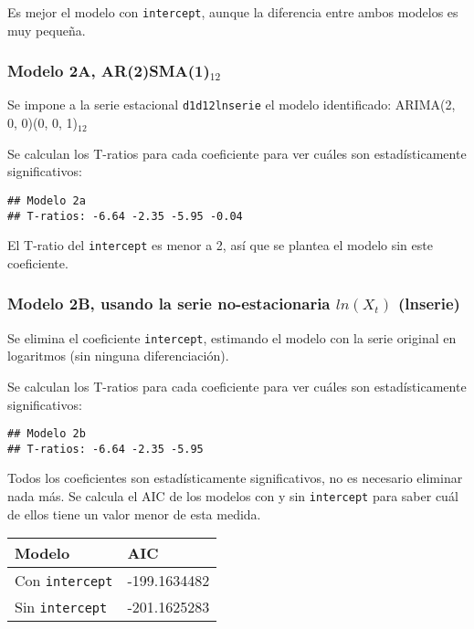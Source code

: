 \documentclass[
]{article}
\begin{document}
Es mejor el modelo con \texttt{intercept}, aunque la diferencia entre
ambos modelos es muy pequeña.

\medskip

\hypertarget{modelo-2a-ar2sma1_12}{%
\subsubsection{\texorpdfstring{Modelo 2A,
AR(2)SMA(1)\(_{12}\)}{Modelo 2A, AR(2)SMA(1)\_\{12\}}}\label{modelo-2a-ar2sma1_12}}

Se impone a la serie estacional \texttt{d1d12lnserie} el modelo
identificado: ARIMA(2, 0, 0)(0, 0, 1)\(_{12}\)

Se calculan los T-ratios para cada coeficiente para ver cuáles son
estadísticamente significativos:

\begin{verbatim}
## Modelo 2a 
## T-ratios: -6.64 -2.35 -5.95 -0.04
\end{verbatim}

El T-ratio del \texttt{intercept} es menor a 2, así que se plantea el
modelo sin este coeficiente.

\medskip

\hypertarget{modelo-2b-usando-la-serie-no-estacionaria-lnx_t-lnserie}{%
\subsubsection{\texorpdfstring{Modelo 2B, usando la serie
no-estacionaria \(ln(X_t)\)
(lnserie)}{Modelo 2B, usando la serie no-estacionaria ln(X\_t) (lnserie)}}\label{modelo-2b-usando-la-serie-no-estacionaria-lnx_t-lnserie}}

Se elimina el coeficiente \texttt{intercept}, estimando el modelo con la
serie original en logaritmos (sin ninguna diferenciación).

Se calculan los T-ratios para cada coeficiente para ver cuáles son
estadísticamente significativos:

\begin{verbatim}
## Modelo 2b 
## T-ratios: -6.64 -2.35 -5.95
\end{verbatim}

Todos los coeficientes son estadísticamente significativos, no es
necesario eliminar nada más. Se calcula el AIC de los modelos con y sin
\texttt{intercept} para saber cuál de ellos tiene un valor menor de esta
medida.

\begin{longtable}[]{@{}ll@{}}
\toprule()
Modelo & AIC \\
\midrule()
\endhead
Con \texttt{intercept} & -199.1634482 \\
Sin \texttt{intercept} & -201.1625283 \\
\bottomrule()
\end{longtable}
\end{document}
